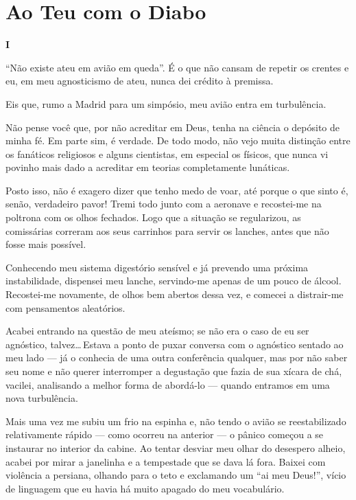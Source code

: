 \chapter{Ao Teu com o Diabo}


\begin{center}
{\Large \textbf{I}}
\end{center}

``Não existe ateu em avião em queda''. É o que não cansam de repetir os crentes e eu, em meu agnosticismo de ateu, nunca dei crédito à premissa.

Eis que, rumo a Madrid para um simpósio, meu avião entra em turbulência.

Não pense você que, por não acreditar em Deus, tenha na ciência o depósito de minha fé. Em parte sim, é verdade. De todo modo, não vejo muita distinção entre os fanáticos religiosos e alguns cientistas, em especial os físicos, que nunca vi povinho mais dado a acreditar em teorias completamente lunáticas.

Posto isso, não é exagero dizer que tenho medo de voar, até porque o que sinto é, senão, verdadeiro pavor! Tremi todo junto com a aeronave e recostei-me na poltrona com os olhos fechados. Logo que a situação se regularizou, as comissárias correram aos seus carrinhos para servir os lanches, antes que não fosse mais possível.

Conhecendo meu sistema digestório sensível e já prevendo uma próxima instabilidade, dispensei meu lanche, servindo-me apenas de um pouco de álcool. Recostei-me novamente, de olhos bem abertos dessa vez, e comecei a distrair-me com pensamentos aleatórios.

Acabei entrando na questão de meu ateísmo; se não era o caso de eu ser agnóstico, talvez\ldots\,Estava a ponto de puxar conversa com o agnóstico sentado ao meu lado --- já o conhecia de uma outra conferência qualquer, mas por não saber seu nome e não querer interromper a degustação que fazia de sua xícara de chá, vacilei, analisando a melhor forma de abordá-lo --- quando entramos em uma nova turbulência.

Mais uma vez me subiu um frio na espinha e, não tendo o avião se reestabilizado relativamente rápido --- como ocorreu na anterior --- o pânico começou a se instaurar no interior da cabine. Ao tentar desviar meu olhar do desespero alheio, acabei por mirar a janelinha e a tempestade que se dava lá fora. Baixei com violência a persiana, olhando para o teto e exclamando um ``ai meu Deus!'', vício de linguagem que eu havia há muito apagado do meu vocabulário.

